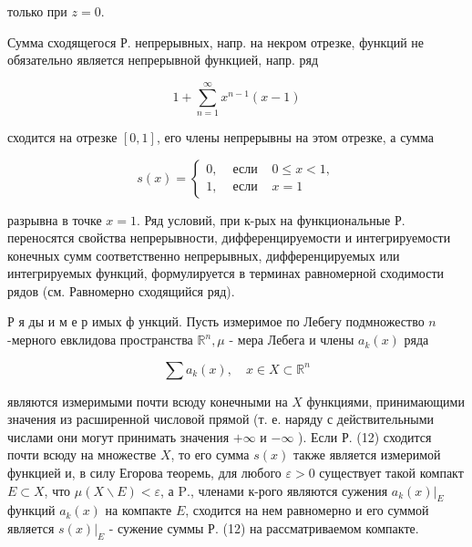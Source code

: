 \documentclass[10pt]{article}
\begin{document}
только при $z=0$.



Сумма сходящегося Р. непрерывных, напр. на некром отрезке, функций не обязательно является непрерывной функцией, напр. ряд



\[

1+\sum_{n=1}^{\infty} x^{n-1}(x-1)

\]



сходится на отрезке $[0,1]$, его члены непрерывны на этом отрезке, а сумма



\[

s(x)=\left\{\begin{array}{lll}

0, & \text { если } & 0 \leqslant x<1, \\

1, & \text { если } & x=1

\end{array}\right.

\]



разрывна в точке $x=1$. Ряд условий, при к-рых на функциональные Р. переносятся свойства непрерывности, дифференцируемости и интегрируемости конечных сумм соответственно непрерывных, дифференцируемых или интегрируемых функций, формулируется в терминах равномерной сходимости рядов (см. Равномерно сходящийся ряд).



Р я ды и м е р имых ф ункций. Пусть измеримое по Лебегу подмножество $n$-мерного евклидова пространства $\mathbb{R}^{n}, \mu$ - мера Лебега и члены $a_{k}(x)$ ряда



\[

\sum a_{k}(x), \quad x \in X \subset \mathbb{R}^{n}

\]



являются измеримыми почти всюду конечными на $X$ функциями, принимающими значения из расширенной числовой прямой (т. е. наряду с действительными числами они могут принимать значения $+\infty$ и $-\infty$ ). Если Р. (12) сходится почти всюду на множестве $X$, то его сумма $s(x)$ также является измеримой функцией и, в силу Егорова теоремь, для любого $\varepsilon>0$ существует такой компакт $E \subset X$, что $\mu(X \backslash E)<\varepsilon$, а $\mathrm{P}$., членами к-рого являются сужения $\left.a_{k}(x)\right|_{E}$ функций $a_{k}(x)$ на компакте $E$, сходится на нем равномерно и его суммой является $\left.s(x)\right|_{E}$ - сужение суммы Р. (12) на рассматриваемом компакте.
\end{document}
